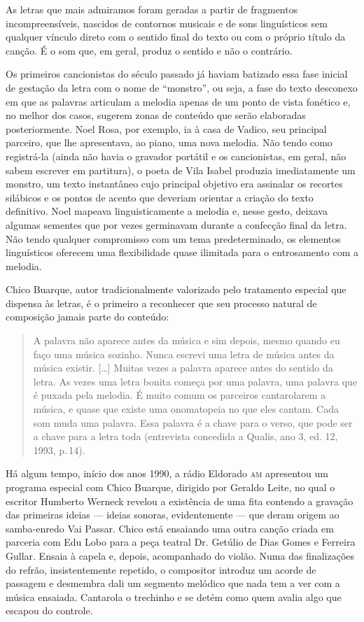 As letras que mais admiramos foram geradas a partir de fragmentos incompreensíveis, nascidos de contornos musicais e de sons linguísticos
sem qualquer vínculo direto com o sentido final do texto ou com o
próprio título da canção. É o som que, em geral, produz o sentido e não
o contrário.

Os primeiros cancionistas do século passado já haviam batizado essa fase
inicial de gestação da letra com o nome de ``monstro'', ou seja, a fase
do texto desconexo em que as palavras articulam a melodia apenas de um
ponto de vista fonético e, no melhor dos casos, sugerem zonas de
conteúdo que serão elaboradas posteriormente. Noel Rosa, por exemplo, ia
à casa de Vadico, seu principal parceiro, que lhe apresentava, ao piano,
uma nova melodia. Não tendo como registrá-la (ainda não havia o gravador
portátil e os cancionistas, em geral, não sabem escrever em partitura),
o poeta de Vila Isabel produzia imediatamente um monstro, um texto
instantâneo cujo principal objetivo era assinalar os recortes silábicos
e os pontos de acento que deveriam orientar a criação do texto
definitivo. Noel mapeava linguisticamente a melodia e, nesse gesto,
deixava algumas sementes que por vezes germinavam durante a confecção
final da letra. Não tendo qualquer compromisso com um tema
predeterminado, os elementos linguísticos oferecem uma flexibilidade
quase ilimitada para o entrosamento com a melodia.

Chico Buarque, autor tradicionalmente valorizado pelo tratamento
especial que dispensa às letras, é o primeiro a reconhecer que seu
processo natural de composição jamais parte do conteúdo:

\begin{quote}
A palavra não aparece antes da música e sim depois, mesmo quando eu faço
uma música sozinho. Nunca escrevi uma letra de música antes da música
existir. {[}\ldots{]} Muitas vezes a palavra aparece antes do sentido da
letra. As vezes uma letra bonita começa por uma palavra, uma palavra que
é puxada pela melodia. É muito comum os parceiros cantarolarem a música,
e quase que existe uma onomatopeia no que eles cantam. Cada som muda uma
palavra. Essa palavra é a chave para o verso, que pode ser a chave para
a letra toda (entrevista concedida a Qualis, ano 3, ed. 12, 1993, p.\,14).
\end{quote}

Há algum tempo, início dos anos 1990, a rádio Eldorado \textsc{am} apresentou um
programa especial com Chico Buarque, dirigido por Geraldo Leite, no qual
o escritor Humberto Werneck revelou a existência de uma fita contendo a
gravação das primeiras ideias --- ideias sonoras, evidentemente --- que
deram origem ao samba-enredo Vai Passar. Chico está ensaiando uma outra
canção criada em parceria com Edu Lobo para a peça teatral Dr. Getúlio
de Dias Gomes e Ferreira Gullar. Ensaia à capela e, depois, acompanhado
do violão. Numa das finalizações do refrão, insistentemente repetido, o
compositor introduz um acorde de passagem e desmembra dali um segmento
melódico que nada tem a ver com a música ensaiada. Cantarola o trechinho
e se detém como quem avalia algo que escapou do controle.

